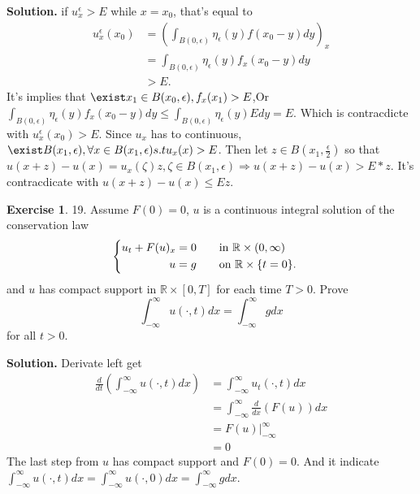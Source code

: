 \documentclass[a4paper]{book}
\newenvironment{solution}%
{\noindent\textbf{Solution.}}%
{\qedhere}
\numberwithin{equation}{chapter}
\theoremstyle{definition}
\newtheorem{exc}[exm]{Exercise}
\begin{document}
\begin{solution}
  if $u_x^\epsilon > E$ while $x = x_0$, that's equal to
  \begin{align*}
    u_x^\epsilon(x_0) &= (\int_{B(0,\epsilon)}\eta_\epsilon(y)f(x_0 -y)dy)_x \\
                      &= \int_{B(0,\epsilon)}\eta_\epsilon(y)f_x(x_0 -y)dy \\
    & > E.
  \end{align*}
  It's implies that $\exist x_1 \in B(x_0,\epsilon), f_x(x_1) > E$,Or $\int_{B(0,\epsilon)}\eta_\epsilon(y)f_x(x_0 -y)dy \leq \int_{B(0,\epsilon)}\eta_\epsilon(y)Edy = E$. Which is contracdicte with $u_x^\epsilon(x_0) > E$. Since $u_x$ has to continuous, $\exist B(x_1, \epsilon), \forall x \in B(x_1, \epsilon) s.t u_x(x) > E$. Then let $z \in B(x_1, \frac{\epsilon}{2})$ so that $u(x + z) - u(x) = u_x(\zeta) z, \zeta \in B(x_1, \epsilon) \Rightarrow u(x +z) - u(x) > E *z$. It's contracdicate with $u(x + z) - u(x) \leq Ez$.
\end{solution}


\begin{exc}
  19.  Assume $F(0) = 0$, $u$ is a continuous integral solution of the conservation law
  \begin{equation*}
    \begin{cases}
      \begin{aligned}
        u_t + F(u)_x = 0 \qquad &\textmd{in } \mathbb{R} \times (0, \infty) \\
        u = g \qquad &\textmd{on } \mathbb{R} \times \{t = 0\}.
      \end{aligned}
    \end{cases}
  \end{equation*}
  and $u$ has compact support in $\mathbb{R} \times [0, T]$ for each time $T > 0$. Prove
  \[\int_{-\infty}^{\infty} u(\cdot,t)dx = \int_{-\infty}^{\infty}g dx\]
  for all $t > 0$.
\end{exc}

\begin{solution}
  Derivate left get
  \begin{align*}
    \frac{d}{dt}(\int_{-\infty}^{\infty}u(\cdot,t)dx) &= \int_{-\infty}^{\infty}u_t(\cdot,t)dx \\
                                                      &= \int_{-\infty}^{\infty}\frac{d}{dx}(F(u))dx \\
                                                      &= \left. F(u) \right|_{-\infty}^\infty \\
                                                      &= 0
  \end{align*}
  The last step from $u$ has compact support and $F(0) = 0$. And it indicate $\int_{-\infty}^{\infty} u(\cdot,t)dx = \int_{-\infty}^{\infty} u(\cdot,0)dx = \int_{-\infty}^{\infty} gdx$.
\end{solution}
\end{document}
